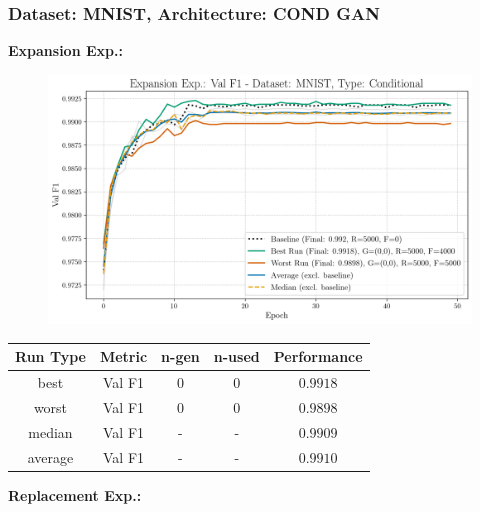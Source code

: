 \subsubsection{Dataset: MNIST, Architecture: COND GAN}
\noindent\textbf{Expansion Exp.:}
\begin{figure}[htbp]
	\centering
	\includegraphics[width=.85\textwidth]{abb/strat_classifier_performance/MNIST_STRATIFIED_CLASSIFIERS_COND_GAN/expansion_experiments/val_f1_score_['COND']_MNIST_all.png}
	\label{fig:app_strat_class_performance_expansion_exp._val_f1_score_}
\end{figure}
\begin{table}[H]
	\centering
	\vspace{-1em}
	\begin{tabular}{|c|c|c|c|c|}
		\hline
		Run Type & Metric & n-gen & n-used & Performance \\ \hline
		best & Val F1 & 0 & 0 & $0.9918$\\ \hline
		worst & Val F1 & 0 & 0 & $0.9898$\\ \hline
		median & Val F1 & - & - & $0.9909$\\ \hline
		average & Val F1 & - & - & $0.9910$
		\\ \hline
	\end{tabular}
\end{table}
\noindent\textbf{Replacement Exp.:}
